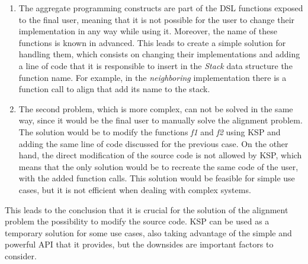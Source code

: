 \begin{enumerate}
    \item The aggregate programming constructs are part of the DSL functions exposed to the final user, meaning that it is not possible for the user to change their implementation in any way while using it. Moreover, the name of these functions is known in advanced. This leads to create a simple solution for handling them, which consists on changing their implementations and adding a line of code that it is responsible to insert in the \textit{Stack} data structure the function name. For example, in the \textit{neighboring} implementation there is a function call to align that add its name to the stack.
    \item The second problem, which is more complex, can not be solved in the same way, since it would be the final user to manually solve the alignment problem. The solution would be to modify the functions \textit{f1} and \textit{f2} using KSP and adding the same line of code discussed for the previous case. On the other hand, the direct modification of the source code is not allowed by KSP, which means that the only solution would be to recreate the same code of the user, with the added function calls. This solution would be feasible for simple use cases, but it is not efficient when dealing with complex systems.
\end{enumerate}
This leads to the conclusion that it is crucial for the solution of the alignment problem the possibility to modify the source code. KSP can be used as a temporary solution for some use cases, also taking advantage of the simple and powerful API that it provides, but the downsides are important factors to consider.

